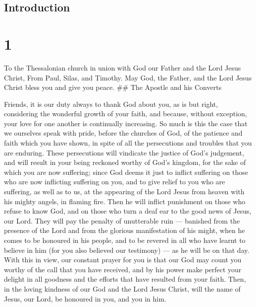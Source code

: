 \hypertarget{introduction}{%
\subsection{Introduction}\label{introduction}}

\hypertarget{section}{%
\section{1}\label{section}}

 To the Thessalonian church in union with God our Father and
the Lord Jesus Christ, From Paul, Silas, and Timothy.  May
God, the Father, and the Lord Jesus Christ bless you and give you peace.
\#\# The Apostle and his Converts

 Friends, it is our duty always to thank God about you, as
is but right, considering the wonderful growth of your faith, and
because, without exception, your love for one another is continually
increasing.  So much is this the case that we ourselves
speak with pride, before the churches of God, of the patience and faith
which you have shown, in spite of all the persecutions and troubles that
you are enduring.  These persecutions will vindicate the
justice of God's judgement, and will result in your being reckoned
worthy of God's kingdom, for the sake of which you are now suffering;
 since God deems it just to inflict suffering on those who
are now inflicting suffering on you,  and to give relief to
you who are suffering, as well as to us, at the appearing of the Lord
Jesus from heaven with his mighty angels, in flaming fire. 
Then he will inflict punishment on those who refuse to know God, and on
those who turn a deaf ear to the good news of Jesus, our Lord.
 They will pay the penalty of unutterable ruin --- banished
from the presence of the Lord and from the glorious manifestation of his
might,  when he comes to be honoured in his people, and to
be revered in all who have learnt to believe in him (for you also
believed our testimony) --- as he will be on that day. 
With this in view, our constant prayer for you is that our God may count
you worthy of the call that you have received, and by his power make
perfect your delight in all goodness and the efforts that have resulted
from your faith.  Then, in the loving kindness of our God
and the Lord Jesus Christ, will the name of Jesus, our Lord, be honoured
in you, and you in him.

